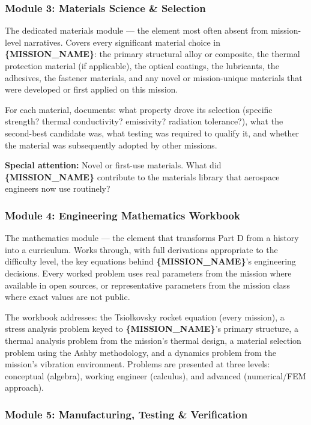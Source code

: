 \documentclass[11pt,letterpaper]{article}
\newcommand{\param}[1]{\textcolor{paramred}{\textbf{\{#1\}}}}
\begin{document}
\subsubsection{Module 3: Materials Science \& Selection}

The dedicated materials module --- the element most often absent from mission-level narratives. Covers every significant material choice in \param{MISSION\_NAME}: the primary structural alloy or composite, the thermal protection material (if applicable), the optical coatings, the lubricants, the adhesives, the fastener materials, and any novel or mission-unique materials that were developed or first applied on this mission.

For each material, documents: what property drove its selection (specific strength? thermal conductivity? emissivity? radiation tolerance?), what the second-best candidate was, what testing was required to qualify it, and whether the material was subsequently adopted by other missions.

\textbf{Special attention:} Novel or first-use materials. What did \param{MISSION\_NAME} contribute to the materials library that aerospace engineers now use routinely?

\subsubsection{Module 4: Engineering Mathematics Workbook}

The mathematics module --- the element that transforms Part D from a history into a curriculum. Works through, with full derivations appropriate to the difficulty level, the key equations behind \param{MISSION\_NAME}'s engineering decisions. Every worked problem uses real parameters from the mission where available in open sources, or representative parameters from the mission class where exact values are not public.

The workbook addresses: the Tsiolkovsky rocket equation (every mission), a stress analysis problem keyed to \param{MISSION\_NAME}'s primary structure, a thermal analysis problem from the mission's thermal design, a material selection problem using the Ashby methodology, and a dynamics problem from the mission's vibration environment. Problems are presented at three levels: conceptual (algebra), working engineer (calculus), and advanced (numerical/FEM approach).

\subsubsection{Module 5: Manufacturing, Testing \& Verification}
\end{document}

